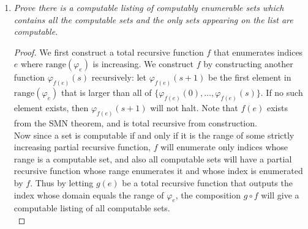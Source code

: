 \documentclass{article}
\begin{document}
\begin{enumerate}[label={\bf Q\arabic*:}]
\begin{proof}
      Fix an enumeration of the sentences $\Phi$. We build the tree $T$ in
      steps, such that $T=\cup_{n\in\omega} T_n$, where $T_n=T\cap2^n$. At
      each step $n$, we choose an appropriate sentence $\varphi_n$ and
      extend the tree $T_{n-1}$ to $T_n$ in the way that was described in
      Question 2. At even steps, the sentence we choose is the first one in
      the enumeration $\Phi$ that has not been used yet. At odd steps
      $2n+1$, the sentence we choose is the one described earlier, where we
      effectively construct a sentence that is independent of all the
      consistent theories of the branches of of length $2n$. Note that the
      theory of each branch is computable since it is the finite
      conjunction of the sentences in of the branch together with PA. So
      setting $M$ to be all the even numbers gives us an infinite
      computable set that satisfies the requirements.
    \end{proof}

  \item \it Prove there is a computable listing of computably enumerable
    sets which contains all the computable sets and the only sets appearing
    on the list are computable.

    \begin{proof}
      We first construct a total recursive function $f$ that enumerates
      indices $e$ where $\text{range}(\varphi_e)$ is increasing. We
      construct $f$ by constructing another function $\varphi_{f(e)}(s)$
      recursively: let $\varphi_{f(e)}(s+1)$ be the first element in
      $\text{range}(\varphi_e)$ that is larger than all of
      $\{\varphi_{f(e)}(0), \ldots,\varphi_{f(e)}(s)\}$. If no such element
      exists, then $\varphi_{f(e)}(s+1)$ will not halt. Note that $f(e)$
      exists from the SMN theorem, and is total recursive from
      construction. \\

      Now since a set is computable if and only if it is the range of some
      strictly increasing partial recursive function, $f$ will enumerate
      only indices whose range is a computable set, and also all computable
      sets will have a partial recursive function whose range enumerates it
      and whose index is enumerated by $f$. Thus by letting $g(e)$ be a
      total recursive function that outputs the index whose domain equals
      the range of $\varphi_e$, the composition $g\circ f$ will give a
      computable listing of all computable sets. \\


\end{proof}
\end{enumerate}
\end{document}
